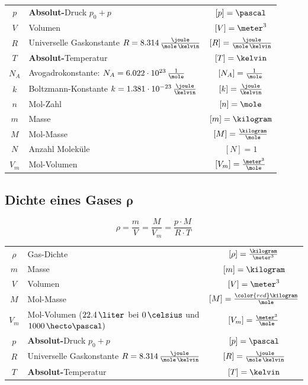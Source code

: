 \renewcommand{\arraystretch}{1.3}
\begin{tabular}{c l c}
	$p$ 	& \textbf{Absolut-}Druck $p_0 + p$ 											& $[p] = \pascal$ 							\\
	$V$ 	& Volumen 																	& $[V] = \meter^3$ 							\\
	$R$		& Universelle Gaskonstante $R = 8.314 \, \frac{\joule}{\mole \, \kelvin}$ 	& $[R] = \frac{\joule}{\mole \, \kelvin}$ 	\\
	$T$ 	& \textbf{Absolut-}Temperatur 												& $[T] = \kelvin$ 							\\
	$N_A$	& Avogadrokonstante: $N_A = 6.022 \cdot 10^{23} \, \frac{1}{\mole}$ 		& $[N_A] = \frac{1}{\mole}$					\\	
	$k$		& Boltzmann-Konstante $k = 1.381 \cdot 10^{-23} \, \frac{\joule}{\kelvin}$ 	& $[k] = \frac{\joule}{\kelvin}$			\\
	$n$ 	& Mol-Zahl 																	& $[n] = \mole$ 							\\
	$m$ 	& Masse 																	& $[m] = \kilogram$ 						\\
	$M$ 	& Mol-Masse 																& $[M] = \frac{\kilogram}{\mole}$			\\
	$N$ 	& Anzahl Moleküle 															& $[N] = 1$ 								\\
	$V_m$ 	& Mol-Volumen 																& $[V_m] = \frac{\meter^3}{\mole}$
\end{tabular}
\renewcommand{\arraystretch}{1}


\subsection[Dichte eines Gases]{Dichte eines Gases $\bm{\rho}$}

\vspace{-0.2cm}

$$ \boxed{ \rho = \frac{m}{V} = \frac{M}{V_m} = \frac{p \cdot M}{R \cdot T} }$$

\renewcommand{\arraystretch}{1.3}
\begin{tabular}{c l c}
	$\rho$ 	& Gas-Dichte 																		& $[\rho] = \frac{\kilogram}{\meter^3}$		\\
	$m$ 	& Masse 																			& $[m] = \kilogram$ 						\\
	$V$ 	& Volumen 																			& $[V] = \meter^3$ 							\\
	$M$ 	& Mol-Masse 																		& $[M] = \frac{\color{red}\kilogram}{\mole}$			\\
	$V_m$ 	& Mol-Volumen ($22.4 \, \liter$ bei $0 \, \celsius$ und $1000 \, \hecto \pascal)$	& $[V_m] = \frac{\meter^3}{\mole}$ 			\\
	$p$ 	& \textbf{Absolut-}Druck $p_0 + p$ 													& $[p] = \pascal$ 							\\
	$R$		& Universelle Gaskonstante $R = 8.314 \, \frac{\joule}{\mole \, \kelvin}$ 			& $[R] = \frac{\joule}{\mole \, \kelvin}$ 	\\
	$T$ 	& \textbf{Absolut-}Temperatur 														& $[T] = \kelvin$
\end{tabular}
\renewcommand{\arraystretch}{1}\smallskip

